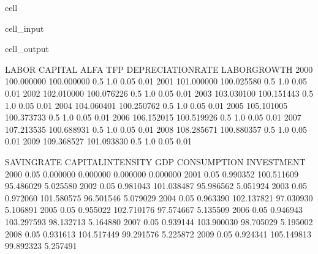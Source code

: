 \documentclass[letterpaper,10pt,english]{jupyterBook}
\begin{document}
\begin{sphinxuseclass}{cell}\begin{sphinxVerbatimInput}

\begin{sphinxuseclass}{cell_input}
\begin{sphinxVerbatim}[commandchars=\\\{\}]
   

\end{sphinxVerbatim}

\end{sphinxuseclass}\end{sphinxVerbatimInput}
\begin{sphinxVerbatimOutput}

\begin{sphinxuseclass}{cell_output}
\begin{sphinxVerbatim}[commandchars=\\\{\}]
           LABOR     CAPITAL  ALFA  TFP  DEPRECIATION\PYGZus{}RATE  LABOR\PYGZus{}GROWTH  \PYGZbs{}
2000  100.000000  100.000000   0.5  1.0               0.05          0.01   
2001  101.000000  100.025580   0.5  1.0               0.05          0.01   
2002  102.010000  100.076226   0.5  1.0               0.05          0.01   
2003  103.030100  100.151443   0.5  1.0               0.05          0.01   
2004  104.060401  100.250762   0.5  1.0               0.05          0.01   
2005  105.101005  100.373733   0.5  1.0               0.05          0.01   
2006  106.152015  100.519926   0.5  1.0               0.05          0.01   
2007  107.213535  100.688931   0.5  1.0               0.05          0.01   
2008  108.285671  100.880357   0.5  1.0               0.05          0.01   
2009  109.368527  101.093830   0.5  1.0               0.05          0.01   

      SAVING\PYGZus{}RATE  CAPITAL\PYGZus{}INTENSITY         GDP  CONSUMPTION  INVESTMENT  
2000         0.05           0.000000    0.000000     0.000000    0.000000  
2001         0.05           0.990352  100.511609    95.486029    5.025580  
2002         0.05           0.981043  101.038487    95.986562    5.051924  
2003         0.05           0.972060  101.580575    96.501546    5.079029  
2004         0.05           0.963390  102.137821    97.030930    5.106891  
2005         0.05           0.955022  102.710176    97.574667    5.135509  
2006         0.05           0.946943  103.297593    98.132713    5.164880  
2007         0.05           0.939144  103.900030    98.705029    5.195002  
2008         0.05           0.931613  104.517449    99.291576    5.225872  
2009         0.05           0.924341  105.149813    99.892323    5.257491  
\end{sphinxVerbatim}

\end{sphinxuseclass}\end{sphinxVerbatimOutput}

\end{sphinxuseclass}
\end{document}
